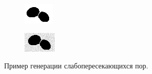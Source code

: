 \documentclass[code]{wordcore}
\begin{document}
\begin{figure}[H]
	\centering
	\begin{subfigure}[t]{0.48\textwidth}
		\includegraphics[width=\textwidth]{fig/low_verlap_noisy.png}
	\end{subfigure}
	\hfill
	\begin{subfigure}[t]{0.48\textwidth}
		\includegraphics[width=\textwidth]{fig/low_overlap_noisy.png}
	\end{subfigure}
	\caption{Пример генерации слабопересекающихся пор.}
\end{figure}
\end{document}
